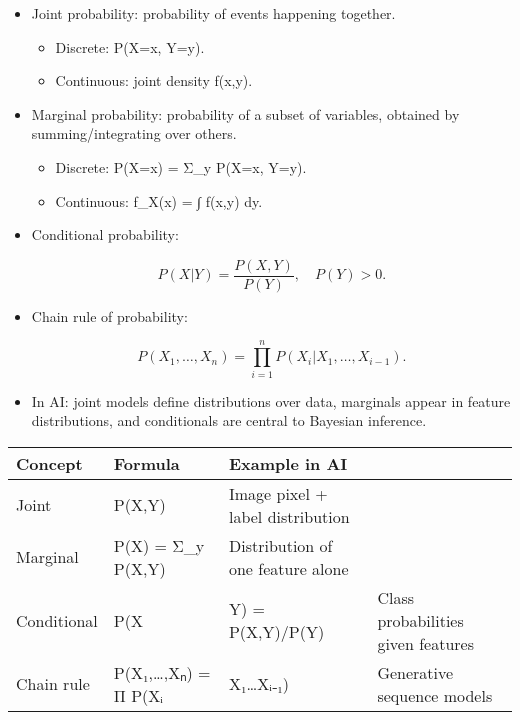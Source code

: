 \documentclass[
  letterpaper,
  DIV=11,
  numbers=noendperiod]{scrreprt}
\providecommand{\tightlist}{%
  \setlength{\itemsep}{0pt}\setlength{\parskip}{0pt}}
\begin{document}
\begin{itemize}
\item
  Joint probability: probability of events happening together.

  \begin{itemize}
  \tightlist
  \item
    Discrete: P(X=x, Y=y).
  \item
    Continuous: joint density f(x,y).
  \end{itemize}
\item
  Marginal probability: probability of a subset of variables, obtained
  by summing/integrating over others.

  \begin{itemize}
  \tightlist
  \item
    Discrete: P(X=x) = Σ\_y P(X=x, Y=y).
  \item
    Continuous: f\_X(x) = ∫ f(x,y) dy.
  \end{itemize}
\item
  Conditional probability:

  \[
  P(X|Y) = \frac{P(X,Y)}{P(Y)}, \quad P(Y)>0.
  \]
\item
  Chain rule of probability:

  \[
  P(X_1, …, X_n) = \prod_{i=1}^n P(X_i | X_1, …, X_{i-1}).
  \]
\item
  In AI: joint models define distributions over data, marginals appear
  in feature distributions, and conditionals are central to Bayesian
  inference.
\end{itemize}

\begin{longtable}[]{@{}
  >{\raggedright\arraybackslash}p{}
  >{\raggedright\arraybackslash}p{}
  >{\raggedright\arraybackslash}p{}
  >{\raggedright\arraybackslash}p{}@{}}
\toprule\noalign{}
\begin{minipage}[b]{\linewidth}\raggedright
Concept
\end{minipage} & \begin{minipage}[b]{\linewidth}\raggedright
Formula
\end{minipage} & \begin{minipage}[b]{\linewidth}\raggedright
Example in AI
\end{minipage} & \begin{minipage}[b]{\linewidth}\raggedright
\end{minipage} \\
\midrule\noalign{}
\endhead
\bottomrule\noalign{}
\endlastfoot
Joint & P(X,Y) & Image pixel + label distribution & \\
Marginal & P(X) = Σ\_y P(X,Y) & Distribution of one feature alone & \\
Conditional & P(X & Y) = P(X,Y)/P(Y) & Class probabilities given
features \\
Chain rule & P(X₁,\ldots,Xₙ) = Π P(Xᵢ & X₁\ldots Xᵢ₋₁) & Generative
sequence models \\
\end{longtable}
\end{document}

